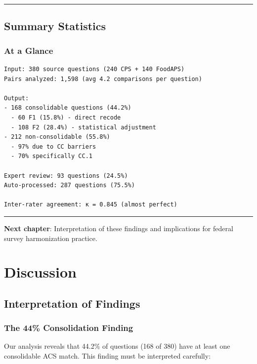 \documentclass[
  letterpaper,
]{report}
\begin{document}
\begin{center}\rule{0.5\linewidth}{0.5pt}\end{center}

\section{Summary Statistics}\label{summary-statistics-1}

\subsection{At a Glance}\label{at-a-glance}

\begin{verbatim}
Input: 380 source questions (240 CPS + 140 FoodAPS)
Pairs analyzed: 1,598 (avg 4.2 comparisons per question)

Output:
- 168 consolidable questions (44.2%)
  - 60 F1 (15.8%) - direct recode
  - 108 F2 (28.4%) - statistical adjustment
- 212 non-consolidable (55.8%)
  - 97% due to CC barriers
  - 70% specifically CC.1

Expert review: 93 questions (24.5%)
Auto-processed: 287 questions (75.5%)

Inter-rater agreement: κ = 0.845 (almost perfect)
\end{verbatim}

\begin{center}\rule{0.5\linewidth}{0.5pt}\end{center}

\textbf{Next chapter}: Interpretation of these findings and implications
for federal survey harmonization practice.


\chapter{Discussion}\label{discussion}

\section{Interpretation of Findings}\label{interpretation-of-findings}

\subsection{The 44\% Consolidation
Finding}\label{the-44-consolidation-finding}

Our analysis reveals that 44.2\% of questions (168 of 380) have at least
one consolidable ACS match. This finding must be interpreted carefully:
\end{document}

